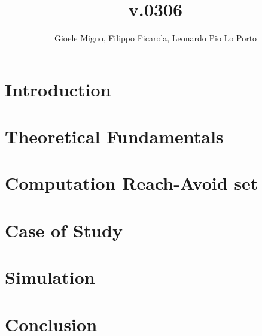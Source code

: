 \documentclass[conference]{IEEEtran}
\begin{document}
    
    \title{\LARGE v.0306}
    \author{Gioele Migno, Filippo Ficarola, Leonardo Pio Lo Porto}
    \maketitle
    
    
    
    \section{Introduction}
        
    
    \section{Theoretical Fundamentals}
        
    
    \section{Computation Reach-Avoid set}
        

    \section{Case of Study}
        

    \section{Simulation}
        
        
    \section{Conclusion}
        

    \clearpage
    \appendix
        

    
\end{document}
